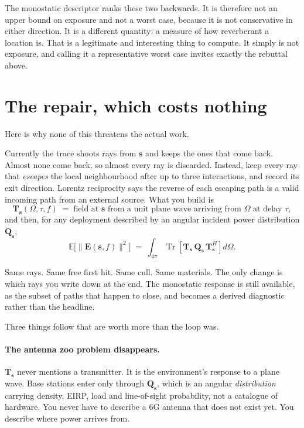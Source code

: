 \documentclass[11pt,a4paper]{article}
\newcommand{\bs}{\mathbf{s}}
\newcommand{\bT}{\mathbf{T}}
\newcommand{\bE}{\mathbf{E}}
\begin{document}
The monostatic descriptor ranks these two backwards. It is therefore not an upper
bound on exposure and not a worst case, because it is not conservative in either
direction. It is a different quantity: a measure of how reverberant a location is.
That is a legitimate and interesting thing to compute. It simply is not exposure,
and calling it a representative worst case invites exactly the rebuttal above.

\section{The repair, which costs nothing}
\label{sec:repair}

Here is why none of this threatens the actual work.

Currently the trace shoots rays from $\bs$ and keeps the ones that come back.
Almost none come back, so almost every ray is discarded. Instead, keep every ray
that \emph{escapes} the local neighbourhood after up to three interactions, and
record its exit direction. Lorentz reciprocity says the reverse of each escaping
path is a valid incoming path from an external source. What you build is
\begin{equation}
  \bT_{\bs}(\Omega, \tau, f) \;=\;
  \text{field at } \bs \text{ from a unit plane wave arriving from } \Omega
  \text{ at delay } \tau,
\end{equation}
and then, for any deployment described by an angular incident power distribution
$\mathbf{Q}_{\bs}$,
\begin{equation}
  \mathbb{E}\bigl[\lVert \bE(\bs,f)\rVert^2\bigr]
  \;=\;
  \int_{4\pi}
  \operatorname{Tr}\!\left[
    \bT_{\bs}\,\mathbf{Q}_{\bs}\,\bT_{\bs}^{H}
  \right] d\Omega .
  \label{eq:factorise}
\end{equation}

Same rays. Same free first hit. Same cull. Same materials. The only change is
which rays you write down at the end. The monostatic response is still available,
as the subset of paths that happen to close, and becomes a derived diagnostic
rather than the headline.

Three things follow that are worth more than the loop was.

\paragraph{The antenna zoo problem disappears.} $\bT_{\bs}$ never mentions a
transmitter. It is the environment's response to a plane wave. Base stations enter
only through $\mathbf{Q}_{\bs}$, which is an angular \emph{distribution} carrying
density, EIRP, load and line-of-sight probability, not a catalogue of hardware.
You never have to describe a 6G antenna that does not exist yet. You describe
where power arrives from.
\end{document}
